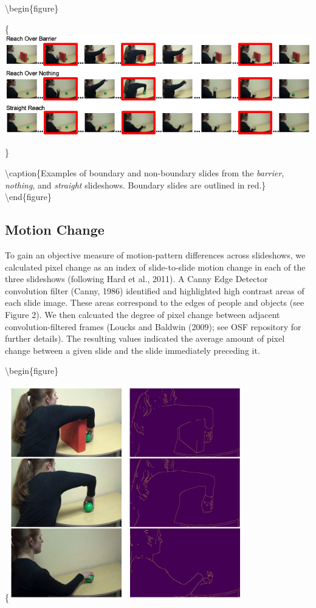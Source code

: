 \documentclass[
  english,
  man,floatsintext]{apa6}
\begin{document}
\textbackslash begin\{figure\}

\{\centering \includegraphics[width=6.28in]{figures/slide_examples}

\}

\textbackslash caption\{Examples of boundary and non-boundary slides from the \emph{barrier}, \emph{nothing}, and \emph{straight} slideshows. Boundary slides are outlined in red.\}\label{fig:fig1}
\textbackslash end\{figure\}

\hypertarget{motion-change}{%
\subsection{Motion Change}\label{motion-change}}

To gain an objective measure of motion-pattern differences across slideshows, we calculated pixel change as an index of slide-to-slide motion change in each of the three slideshows (following Hard et al., 2011). A Canny Edge Detector convolution filter (Canny, 1986) identified and highlighted high contrast areas of each slide image. These areas correspond to the edges of people and objects (see Figure 2). We then calcuated the degree of pixel change between adjacent convolution-filtered frames (Loucks and Baldwin (2009); see OSF repository for further details). The resulting values indicated the average amount of pixel change between a given slide and the slide immediately preceding it.

\textbackslash begin\{figure\}

\{\centering \includegraphics[width=4in]{figures/convolution_filtered}
\end{document}
